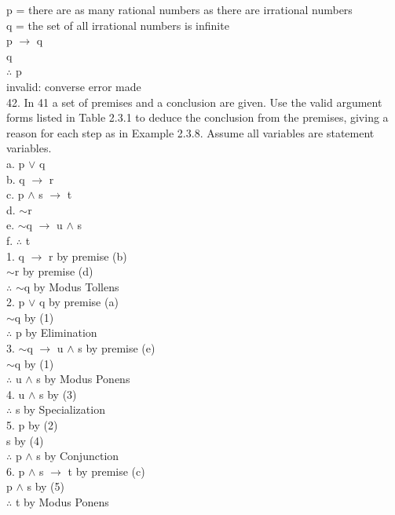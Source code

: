 \documentclass{article}
\begin{document}
p = there are as many rational numbers as there are irrational numbers \\
\indent q = the set of all irrational numbers is infinite \\
\indent p $\rightarrow$ q \\
\indent q \\
\indent $\therefore$ p \\
\indent invalid: converse error made \\
42. In 41 a set of premises and a conclusion are given. Use the valid argument forms listed in Table 2.3.1 to deduce the conclusion
from the premises, giving a reason for each step as in Example 2.3.8. Assume all variables are statement variables. \\
a. p $\vee$ q \\
b. q $\rightarrow$ r \\
c. p $\wedge$ s $\rightarrow$ t \\
d. $\sim$r \\
e. $\sim$q $\rightarrow$ u $\wedge$ s \\
f. $\therefore$ t \\
1. q $\rightarrow$ r by premise (b) \\
\indent $\sim$r by premise (d) \\
$\therefore$ $\sim$q by Modus Tollens \\
2. p $\vee$ q by premise (a) \\
\indent $\sim$q by (1) \\
$\therefore$ p by Elimination \\
3. $\sim$q $\rightarrow$ u $\wedge$ s by premise (e)\\
\indent $\sim$q by (1) \\
$\therefore$ u $\wedge$ s by Modus Ponens \\
4. u $\wedge$ s by (3) \\
$\therefore$ s by Specialization \\
5. p by (2) \\
\indent s by (4) \\
$\therefore$ p $\wedge$ s by Conjunction \\
6. p $\wedge$ s $\rightarrow$ t by premise (c) \\
\indent p $\wedge$ s by (5) \\
$\therefore$ t by Modus Ponens \\
\end{document}
